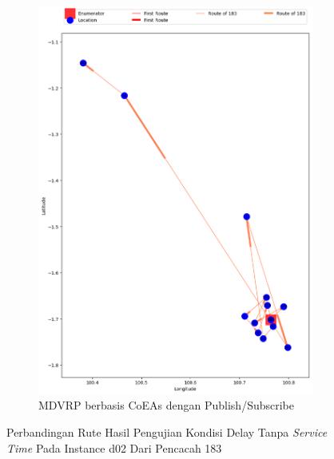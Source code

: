\begin{figure}[H]\ContinuedFloat
	\centering
	\begin{subfigure}[t]{\textwidth}
		\centering
		\includegraphics[width=\textwidth]{Resources/Images/delayed_2/real_m15_n100_delayed_2_183_pubsub_coes}
		\caption{MDVRP berbasis CoEAs dengan Publish/Subscribe}
		\label{fig:real_m15_n100_delayed_2_183_pubsub_coes}
	\end{subfigure}
	\caption{Perbandingan Rute Hasil Pengujian Kondisi Delay Tanpa \textit{Service Time} Pada Instance d02 Dari Pencacah 183}
	\label{fig:real_m15_n100_delayed_2_183_contd}
\end{figure}


